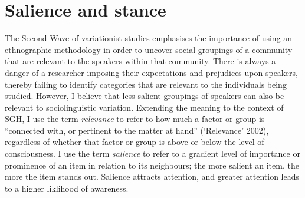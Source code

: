 \section{Salience and stance}\label{sec:salience}
The Second Wave of variationist studies emphasises the importance of using an ethnographic methodology in order to uncover social groupings of a community that are relevant to the speakers within that community. There is always a danger of a researcher imposing their expectations and prejudices upon speakers, thereby failing to identify categories that are relevant to the individuals being studied. However, I believe that less salient groupings of speakers can also be relevant to sociolinguistic variation. Extending the meaning to the context of SGH, I use the term \textit{relevance} to refer to how much a factor or group is ``connected with, or pertinent to the matter at hand'' (`Relevance' 2002), regardless of whether that factor or group is above or below the level of consciousness. I use the term \textit{salience} to refer to a gradient level of importance or prominence of an item in relation to its neighbours; the more salient an item, the more the item stands out. Salience attracts attention, and greater attention leads to a higher liklihood of awareness.

